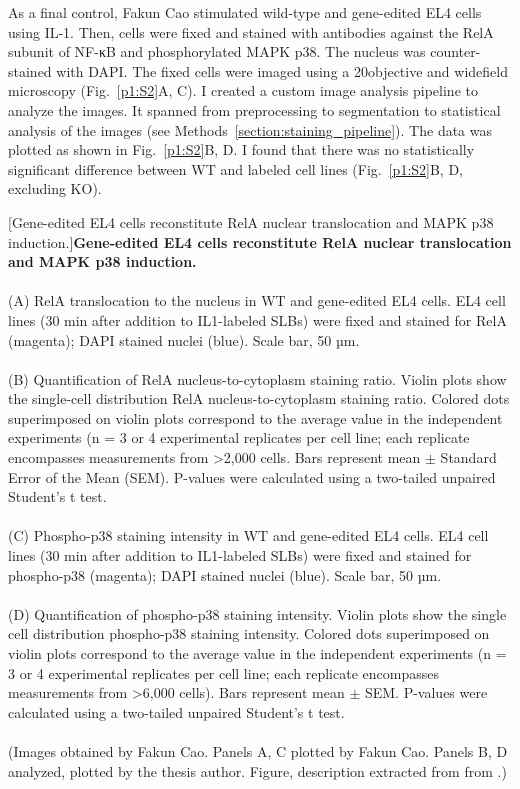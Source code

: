 As a final control, Fakun Cao stimulated wild-type and gene-edited EL4 cells using IL-1. Then, cells were fixed and stained with antibodies against the RelA subunit of NF-κB and phosphorylated MAPK p38. The nucleus was counter-stained with DAPI. The fixed cells were imaged using a 20\times objective and widefield microscopy (Fig.~\ref{p1:S2}A, C). I created a custom image analysis pipeline to analyze the images. It spanned from preprocessing to segmentation to statistical analysis of the images (see Methods~\ref{section:staining_pipeline}). The data was plotted as shown in Fig.~\ref{p1:S2}B, D. I found that there was no statistically significant difference between WT and labeled cell lines (Fig.~\ref{p1:S2}B, D, excluding KO).


\begin{centering}
\captionsetup{parbox=none}
[Gene-edited EL4 cells reconstitute RelA nuclear translocation and MAPK p38 induction.]{\textbf{Gene-edited EL4 cells reconstitute RelA nuclear translocation and MAPK p38 induction.}
\\
\\
(A) RelA translocation to the nucleus in WT and gene-edited EL4 cells. EL4 cell lines (30 min after addition to IL1{\textbeta}-labeled SLBs) were fixed and stained for RelA (magenta); DAPI stained nuclei (blue). Scale bar, 50 µm.
\\
\\
(B) Quantification of RelA nucleus-to-cytoplasm staining ratio. Violin plots show the single-cell distribution RelA nucleus-to-cytoplasm staining ratio. Colored dots superimposed on violin plots correspond to the average value in the independent experiments (n = 3 or 4 experimental replicates per cell line; each replicate encompasses measurements from >2,000 cells. Bars represent mean $\pm$ Standard Error of the Mean (SEM). P-values were calculated using a two-tailed unpaired Student's t test.
\\
\\
(C) Phospho-p38 staining intensity in WT and gene-edited EL4 cells. EL4 cell lines (30 min after addition to IL1{\textbeta}-labeled SLBs) were fixed and stained for phospho-p38 (magenta); DAPI stained nuclei (blue). Scale bar, 50 µm.
\\
\\
(D) Quantification of phospho-p38 staining intensity. Violin plots show the single cell distribution phospho-p38 staining intensity. Colored dots superimposed on violin plots correspond to the average value in the independent experiments (n = 3 or 4 experimental replicates per cell line; each replicate encompasses measurements from >6,000 cells). Bars represent mean $\pm$ SEM. P-values were calculated using a two-tailed unpaired Student's t test.
\\
\\
(Images obtained by Fakun Cao. Panels A, C plotted by Fakun Cao. Panels B, D analyzed, plotted by the thesis author. Figure, description extracted from from \autocite{Deliz-Aguirre_2021}.)}
\label{p1:S2}
\end{centering}

